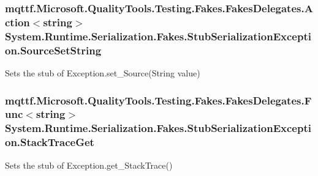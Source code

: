 \hypertarget{class_system_1_1_runtime_1_1_serialization_1_1_fakes_1_1_stub_serialization_exception_a68423595b796f966e6dcdb917fa65e35}{
\subsubsection[{Source\-Set\-String}]{\setlength{\rightskip}{0pt plus 5cm}mqttf.\-Microsoft.\-Quality\-Tools.\-Testing.\-Fakes.\-Fakes\-Delegates.\-Action$<$string$>$ System.\-Runtime.\-Serialization.\-Fakes.\-Stub\-Serialization\-Exception.\-Source\-Set\-String}}\label{class_system_1_1_runtime_1_1_serialization_1_1_fakes_1_1_stub_serialization_exception_a68423595b796f966e6dcdb917fa65e35}


Sets the stub of Exception.\-set\-\_\-\-Source(\-String value)

\hypertarget{class_system_1_1_runtime_1_1_serialization_1_1_fakes_1_1_stub_serialization_exception_a701cdd0aec9fb20b2cb62b52bbe0f8b0}{
\subsubsection[{Stack\-Trace\-Get}]{\setlength{\rightskip}{0pt plus 5cm}mqttf.\-Microsoft.\-Quality\-Tools.\-Testing.\-Fakes.\-Fakes\-Delegates.\-Func$<$string$>$ System.\-Runtime.\-Serialization.\-Fakes.\-Stub\-Serialization\-Exception.\-Stack\-Trace\-Get}}\label{class_system_1_1_runtime_1_1_serialization_1_1_fakes_1_1_stub_serialization_exception_a701cdd0aec9fb20b2cb62b52bbe0f8b0}


Sets the stub of Exception.\-get\-\_\-\-Stack\-Trace()

